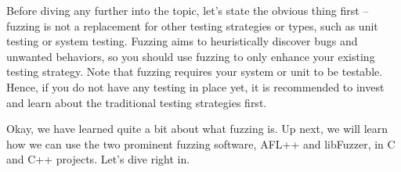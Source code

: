 Before diving any further into the topic, let's state the obvious thing first – fuzzing is not a replacement for other testing strategies or types, such as unit testing or system testing. Fuzzing aims to heuristically discover bugs and unwanted behaviors, so you should use fuzzing to only enhance your existing testing strategy. Note that fuzzing requires your system or unit to be testable. Hence, if you do not have any testing in place yet, it is recommended to invest and learn about the traditional testing strategies first.

Okay, we have learned quite a bit about what fuzzing is. Up next, we will learn how we
can use the two prominent fuzzing software, AFL++ and libFuzzer, in C and C++ projects. Let's dive right in.




























